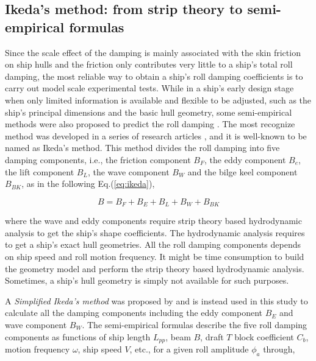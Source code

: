 
\subsection{Ikeda's method: from strip theory to semi-empirical formulas}
\label{se:semi-empirical methods}
Since the scale effect of the damping is mainly associated with the skin friction on ship hulls and the friction only contributes very little to a ship's total roll damping, the most reliable way to obtain a ship's roll damping coefficients is to carry out model scale experimental tests. 
While in a ship's early design stage when only limited information is available and flexible to be adjusted, such as the ship's principal dimensions and the basic hull geometry, some semi-empirical methods were also proposed to predict the roll damping \parencite{himeno_prediction_1981}. The most recognize method was developed in a series of research articles \parencite{ikeda_roll_1978,ikeda_eddy_1978,ikeda_roll_1979,ikeda_components_1978,ikeda_velocity_1979}, and it is well-known to be named as Ikeda's method. This method divides the roll damping into five damping components, i.e., the friction component $B_F$, the eddy component $B_e$, the lift component $B_L$, the wave component $B_W$ and the bilge keel component $B_{BK}$, as in the following Eq.(\ref{eq:ikeda}), 

\begin{equation} \label{eq:ikeda}
B = B_F + B_E + B_L + B_W + B_{BK}
\end{equation}

where the wave and eddy components require strip theory based hydrodynamic analysis to get the ship's shape coefficients. The hydrodynamic analysis requires to get a ship's exact hull geometries. All the roll damping components depends on ship speed and roll motion frequency. It might be time consumption to build the geometry model and perform the strip theory based hydrodynamic analysis. Sometimes, a ship's hull geometry is simply not available for such purposes. 

A \emph{Simplified Ikeda's method} was proposed by \parencite{kawahara_simple_2011} and is instead used in this study to calculate all the damping components including the eddy component $B_E$ and wave component $B_W$. The semi-empirical formulas describe the five roll damping components as functions of ship length $L_{pp}$, beam $B$, draft $T$  block coefficient $C_{b}$, motion frequency $\omega$, ship speed $V$, etc., for a given roll amplitude $\phi_a$ through,

